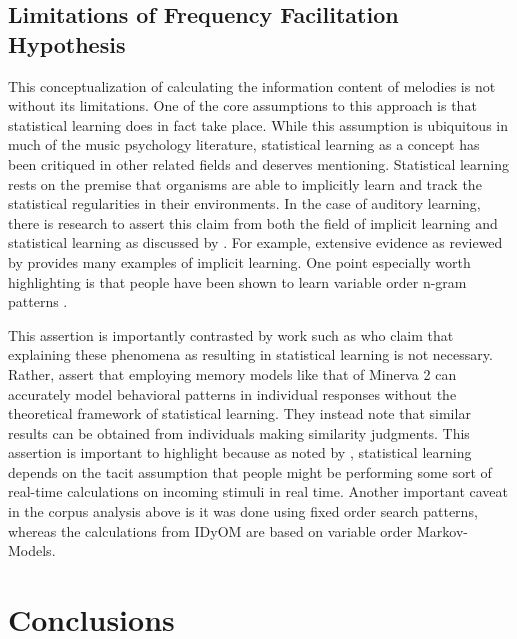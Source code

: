 \documentclass[12pt,]{book}
\begin{document}
\hypertarget{limitations-of-frequency-facilitation-hypothesis}{%
\subsection{Limitations of Frequency Facilitation Hypothesis}\label{limitations-of-frequency-facilitation-hypothesis}}

This conceptualization of calculating the information content of melodies is not without its limitations.
One of the core assumptions to this approach is that statistical learning does in fact take place.
While this assumption is ubiquitous in much of the music psychology literature, statistical learning as a concept has been critiqued in other related fields and deserves mentioning.
Statistical learning rests on the premise that organisms are able to implicitly learn and track the statistical regularities in their environments.
In the case of auditory learning, there is research to assert this claim from both the field of implicit learning and statistical learning as discussed by \citet{perruchetImplicitLearningStatistical2006}.
For example, extensive evidence as reviewed by \citet{cleeremansComputationalModelsImplicit2008} provides many examples of implicit learning.
One point especially worth highlighting is that people have been shown to learn variable order n-gram patterns \citep{remillardImplicitLearningFirst2001}.

This assertion is importantly contrasted by work such as \citet{jamiesonApplyingExemplarModel2009} who claim that explaining these phenomena as resulting in statistical learning is not necessary.
Rather, \citet{jamiesonApplyingExemplarModel2009} assert that employing memory models like that of Minerva 2 can accurately model behavioral patterns in individual responses without the theoretical framework of statistical learning.
They instead note that similar results can be obtained from individuals making similarity judgments.
This assertion is important to highlight because as noted by \citet{perruchetImplicitLearningStatistical2006}, statistical learning depends on the tacit assumption that people might be performing some sort of real-time calculations on incoming stimuli in real time.
Another important caveat in the corpus analysis above is it was done using fixed order search patterns, whereas the calculations from IDyOM are based on variable order Markov-Models.

\hypertarget{conclusions-1}{%
\section{Conclusions}\label{conclusions-1}}
\end{document}
